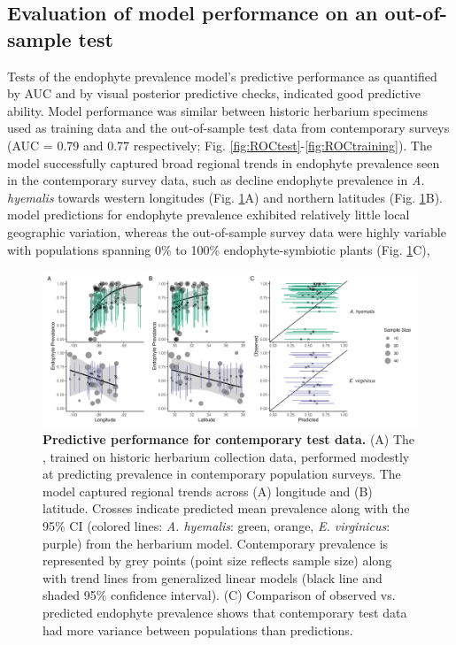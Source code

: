 \documentclass[11pt]{article}
\newcommand{\firstrevise}[1]{{\color{black}{#1}}}
\begin{document}
\subsection*{Evaluation of model performance on an out-of-sample test}
Tests of the endophyte prevalence model's predictive performance as quantified by AUC and by visual posterior predictive checks, indicated good predictive ability. 
Model performance was similar between historic herbarium specimens used as training data and the out-of-sample test data from contemporary surveys (AUC = 0.79 and 0.77 respectively; Fig. \ref{fig:ROCtest}-\ref{fig:ROCtraining}).  
The model successfully captured broad regional trends in endophyte prevalence seen in the contemporary survey data, such as decline endophyte prevalence in \emph{A. hyemalis} towards western longitudes (Fig. \ref{fig:contemptestplot}A) and \firstrevise{an increase towards} northern latitudes (Fig. \ref{fig:contemptestplot}B). 
\firstrevise{It is noteable that} model predictions for endophyte prevalence exhibited relatively little local geographic variation, whereas the out-of-sample survey data were highly variable with populations spanning 0\% to 100\% endophyte-symbiotic plants (Fig. \ref{fig:contemptestplot}C), \firstrevise{indicating population-to-population variation not captured in the endophyte prevalence model.}



\begin{figure}[H]
	\centering
	\includegraphics[width = \linewidth]{../Plots/contemp_test_plot.png}
	\caption[Predictive performance for contemporary test data.]{\textbf{Predictive performance for contemporary test data.} (A)
		 The \firstrevise{endophyte prevalence model}, trained on historic herbarium collection data, performed modestly at predicting prevalence in contemporary population surveys. The model captured regional trends across (A) longitude and (B) latitude. Crosses indicate predicted mean prevalence along with the 95\% CI (colored lines: \emph{A. hyemalis}: green, orange, \emph{E. virginicus}: purple) from the herbarium model. Contemporary prevalence is represented by grey points (point size reflects sample size) along with trend lines from generalized linear models (black line and shaded 95\% confidence interval). (C) Comparison of \firstrevise{contemporary} observed \firstrevise{population prevalence} vs. predicted endophyte prevalence shows that contemporary test data had more variance between populations than \firstrevise{in model} predictions.}
	\label{fig:contemptestplot}
\end{figure}
\end{document}

